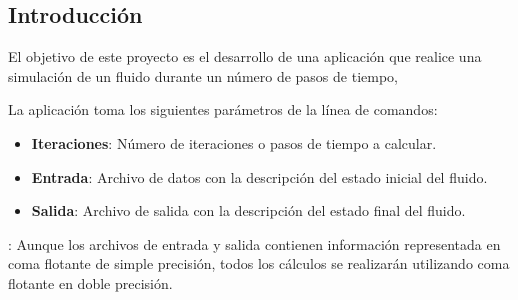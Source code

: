 \subsection{Introducción}

El objetivo de este proyecto es el desarrollo de una aplicación que realice una
simulación de un fluido durante un número de pasos de tiempo,

La aplicación toma los siguientes parámetros de la línea de comandos:

\begin{itemize}
\item \textbf{Iteraciones}: Número de iteraciones o pasos de tiempo a calcular.
\item \textbf{Entrada}: Archivo de datos con la descripción del estado inicial
del fluido.
\item \textbf{Salida}: Archivo de salida con la descripción del estado final del
fluido.
\end{itemize}

: Aunque los archivos de entrada y salida contienen
información representada en coma flotante de simple precisión, todos los
cálculos se realizarán utilizando coma flotante en doble precisión.
